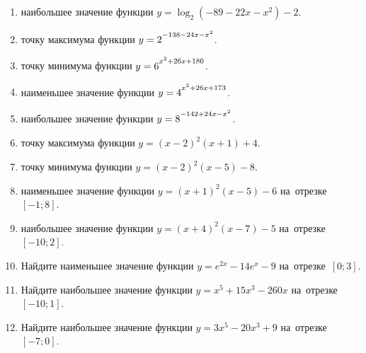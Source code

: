 \documentclass[a4paper,10pt]{article}
\begin{document}
\begin{enumerate}
\item {} наибольшее значение функции $y=\log_2\left(-89-22x-x^2\right)-2$.

\item {} точку максимума функции $y=2\strut^{-138-24x-x^2}$.

\item {} точку минимума функции $y=6\strut^{x^2+26x+180}$.

\item {} наименьшее значение функции $y=4\strut^{x^2+26x+173}$.

\item {} наибольшее значение функции $y=8\strut^{-142+24x-x^2}$.

\item {} точку максимума функции $y=\left(x-2\right)^2\left(x+1\right)+4$.

\item {} точку минимума функции $y=\left(x-2\right)^2\left(x-5\right)-8$.

\item {} наименьшее значение функции $y=\left(x+1\right)^2\left(x-5\right)-6$ на~отрезке~$\left[-1;8\right]$.

\item {} наибольшее значение функции $y=\left(x+4\right)^2\left(x-7\right)-5$ на~отрезке~$\left[-10;2\right]$.

\item Найдите наименьшее значение функции $y=e^{2x}-14e^x-9$ на~отрезке~$\left[0;3\right]$.

\item Найдите наибольшее значение функции $y=x^5+15x^3-260x$ на~отрезке~$\left[-10;1\right]$.

\item Найдите наибольшее значение функции $y=3x^5-20x^3+9$ на~отрезке~$\left[-7;0\right]$.

\end{enumerate}
\end{document}
